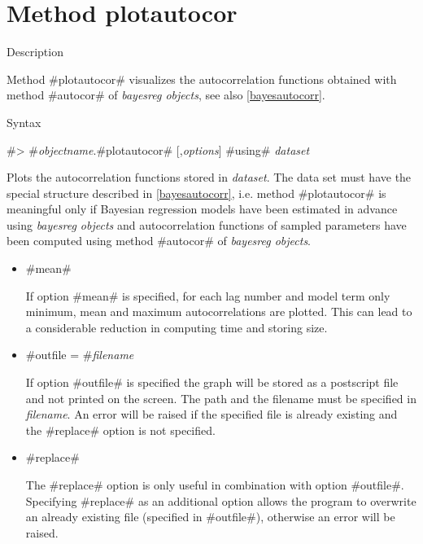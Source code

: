 \clearpage



\section{Method plotautocor}
\label{graphplotautocor} 

\begin{stanza}{Description}

{Method #plotautocor# visualizes the autocorrelation functions
obtained with method #autocor# of {\em bayesreg objects}, see also
\autoref{bayesautocorr}.}
\end{stanza}


\begin{stanza}{Syntax}

{#> #{\em objectname}.#plotautocor# [,{\em options}] #using# {\em dataset}

Plots the autocorrelation functions stored in {\em dataset}. The
data set must have the special structure described in
\autoref{bayesautocorr}, i.e. method #plotautocor# is meaningful
only if Bayesian regression models have been estimated in advance
using {\em bayesreg objects} and autocorrelation functions of
sampled parameters have been computed using method #autocor# of
{\em bayesreg objects}.}
\end{stanza}


\begin{itemize}
\item #mean#

If option #mean# is specified, for each lag number and model term
only minimum, mean and maximum autocorrelations are plotted. This
can lead to a considerable reduction in computing time and storing
size.

\item #outfile = #{\em filename}

If option #outfile# is specified the graph will be stored as a
postscript file and not printed on the screen. The path and the
filename must be specified in {\em filename}. An error will be
raised if the specified file is already existing and the #replace#
option is not specified.

\item #replace#

The #replace# option is only useful in combination with option
#outfile#. Specifying #replace# as an additional option allows the
program to overwrite an already existing file (specified in
#outfile#), otherwise an error will be raised.
\end{itemize}



